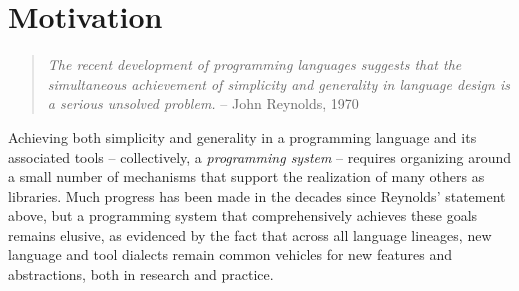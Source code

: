 \vspace{-25pt}
\section{Motivation}\label{motivation}
\begin{quote}\textit{The recent development of programming languages suggests that the simultaneous achievement of simplicity 
and generality in language design is a serious unsolved 
problem.}
-- John Reynolds, 1970 \cite{Reynolds70}\end{quote}
Achieving both simplicity and generality in a programming language and its associated tools -- collectively, a \emph{programming system} -- requires organizing around a small number of mechanisms that support the realization of many others   as libraries. %
Much progress has been made in the decades since Reynolds' statement above, but a programming system that comprehensively achieves these goals remains elusive, as evidenced by the fact that across all language lineages,  new language and tool {dialects} remain common vehicles for new features and abstractions, both in research and practice. %

